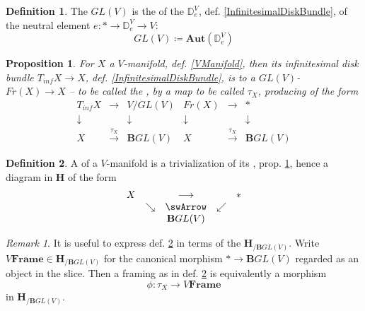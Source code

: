 \documentclass[12pt,titlepage]{article}
\newcommand{\itexarray}[1]{\begin{matrix}#1\end{matrix}}
\theoremstyle{plain}
\newtheorem{prop}{Proposition}
\theoremstyle{definition}
\newtheorem{defn}{Definition}
\theoremstyle{remark}
\newtheorem{remark}{Remark}
\begin{document}
\begin{defn}
\label{GeneralLinearGroup}\hypertarget{GeneralLinearGroup}{}
The  $GL(V)$ is the  of the  $\mathbb{D}^V_e$, def. \ref{InfinitesimalDiskBundle}, of the neutral element $e \colon \ast \to \mathbb{D}^V_e \to V$:
\begin{displaymath}
GL(V) \coloneqq \mathbf{Aut}(\mathbb{D}^V_e)
\end{displaymath}
\end{defn}
\begin{prop}
\label{FrameBundle}\hypertarget{FrameBundle}{}
For $X$ a $V$-manifold, def. \ref{VManifold}, then its infinitesimal disk bundle $T_{inf} X \to X$, def. \ref{InfinitesimalDiskBundle}, is  to a $GL(V)$- $Fr(X) \to X$ -- to be called the ,  by a map to be called $\tau_X$, producing  of the form
\begin{displaymath}
\itexarray{
T_{inf} X &\longrightarrow& V/GL(V)
\\
\downarrow && \downarrow
\\
X &\stackrel{\tau_X}{\longrightarrow}& \mathbf{B} GL(V)
}

\itexarray{
Fr(X) &\longrightarrow& \ast
\\
\downarrow && \downarrow
\\
X &\stackrel{\tau_X}{\longrightarrow}& \mathbf{B} GL(V)
}
\end{displaymath}
\end{prop}
\begin{defn}
\label{Framing}\hypertarget{Framing}{}
A  of a $V$-manifold is a trivialization of its , prop. \ref{FrameBundle}, hence a diagram in $\mathbf{H}$ of the form
\begin{displaymath}
\itexarray{
X && \longrightarrow && \ast
\\
& \searrow &\swArrow& \swarrow
\\
&& \mathbf{B}GL(V)
}
\end{displaymath}
\end{defn}
\begin{remark}
\label{ModuliForFramings}\hypertarget{ModuliForFramings}{}
It is useful to express def. \ref{Framing} in terms of the  $\mathbf{H}_{/\mathbf{B}GL(V)}$. Write $V\mathbf{Frame}\in \mathbf{H}_{/\mathbf{B}GL(V)}$ for the canonical morphism $\ast \to \mathbf{B}GL(V)$ regarded as an object in the slice. Then a framing as in def. \ref{Framing} is equivalently a morphism
\begin{displaymath}
\phi \colon \tau_X \longrightarrow V\mathbf{Frame}
\end{displaymath}
in $\mathbf{H}_{/\mathbf{B}GL(V)}$.
\end{remark}
\end{document}
